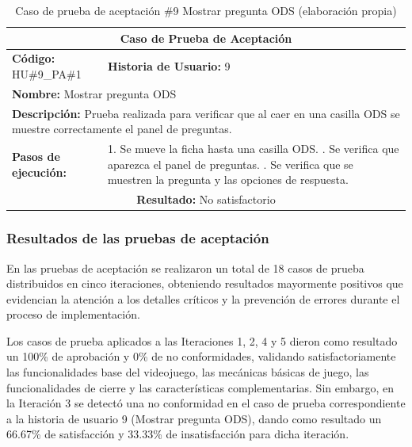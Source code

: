 \begin{table}[H]
\centering
\caption{Caso de prueba de aceptación \#9 Mostrar pregunta ODS (elaboración propia)\label{tab:cpa9}}
\renewcommand{\arraystretch}{1.3}
\begin{tabular}{|p{}|p{}|}
\hline
\multicolumn{2}{|c|}{\textbf{Caso de Prueba de Aceptación}} \\
\hline
\textbf{Código:} HU\#9\_PA\#1 & \textbf{Historia de Usuario:} 9 \\
\hline
\multicolumn{2}{|l|}{\textbf{Nombre:} Mostrar pregunta ODS} \\
\hline
\multicolumn{2}{|p{0.9\textwidth}|}{\textbf{Descripción:} Prueba realizada para verificar que al caer en una casilla ODS se muestre correctamente el panel de preguntas.} \\
\hline
\textbf{Pasos de ejecución:} & 1. Se mueve la ficha hasta una casilla ODS. \newline 2. Se verifica que aparezca el panel de preguntas. \newline 3. Se verifica que se muestren la pregunta y las opciones de respuesta. \\
\hline
\multicolumn{2}{|c|}{\textbf{Resultado:} No satisfactorio} \\
\hline
\end{tabular}
\end{table}

\subsubsection{Resultados de las pruebas de aceptación}

En las pruebas de aceptación se realizaron un total de 18 casos de prueba distribuidos en cinco iteraciones, obteniendo resultados mayormente positivos que evidencian la atención a los detalles críticos y la prevención de errores durante el proceso de implementación.

Los casos de prueba aplicados a las Iteraciones 1, 2, 4 y 5 dieron como resultado un 100\% de aprobación y 0\% de no conformidades, validando satisfactoriamente las funcionalidades base del videojuego, las mecánicas básicas de juego, las funcionalidades de cierre y las características complementarias. Sin embargo, en la Iteración 3 se detectó una no conformidad en el caso de prueba correspondiente a la historia de usuario 9 (Mostrar pregunta ODS), dando como resultado un 66.67\% de satisfacción y 33.33\% de insatisfacción para dicha iteración.

